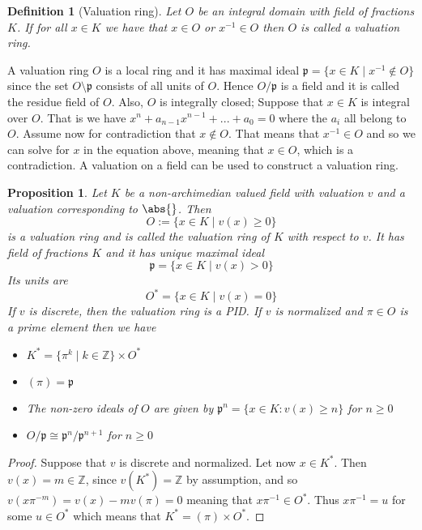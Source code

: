 \documentclass{article}
\newtheorem{definition}{Definition}[section]
\newtheorem{proposition}{Proposition}[section]
\newcommand{\mfrak}[1]{\mathfrak{#1}}
\newcommand{\mbb}[1]{\mathbb{#1}}
\begin{document}
\begin{definition}[Valuation ring]
    Let $O$ be an integral domain with field of fractions $K$. If for all $x \in K$ we have that $x \in O$ or $x^{-1} \in O$ then $O$ is called a valuation ring.
\end{definition}

A valuation ring $O$ is a local ring and it has maximal ideal $\mfrak p = \{x \in K \mid x^{-1} \notin O \}$ since the set $O \setminus \mfrak p$ consists of all units of $O$. Hence $O / \mfrak p$ is a field and it is called the residue field of $O$. Also, $O$ is integrally closed; Suppose that $x \in K$ is integral over $O$. That is we have $x^n + a_{n-1}x^{n-1} + ... + a_0 = 0$ where the $a_i$ all belong to $O$. Assume now for contradiction that $x \notin O$. That means that $x^{-1} \in O$ and so we can solve for $x$ in the equation above, meaning that $x \in O$, which is a contradiction. A valuation on a field can be used to construct a valuation ring.
\begin{proposition}\label{prop: Valuation ring of a field}
    Let $K$ be a non-archimedian valued field with valuation $v$ and a valuation corresponding to $\abs{}$. Then
    $$O := \{x \in K \mid  v(x) \geq 0 \}$$
    is a valuation ring and is called the valuation ring of $K$ with respect to $v$. It has field of fractions $K$ and it has unique maximal ideal
    $$\mfrak p = \{x \in K \mid v(x) > 0 \}$$ %
    Its units are
    $$O^* = \{x \in K \mid v(x) = 0\}$$
    If $v$ is discrete, then the valuation ring is a PID. If $v$ is normalized and $\pi \in O$ is a prime element then we have 
    \begin{itemize}
        \item $K^* = \{\pi^k \mid k \in \mbb Z \} \times O^*$
        \item $(\pi) = \mfrak{p}$
        \item The non-zero ideals of $O$ are given by
        $\mfrak p^n = \{x \in K : v(x) \geq n \}$
        for $n \geq 0$
        \item $O / \mfrak p \cong \mfrak p^n / \mfrak p^{n+1}$ for $n \geq 0$
    \end{itemize}
\end{proposition}
\begin{proof}
    Suppose that $v$ is discrete and normalized. Let now $x \in K^*$. Then $v(x) = m \in \mbb Z$, since $v(K^*) = \mbb Z$ by assumption, and so $v(x \pi^{-m}) = v(x) - mv(\pi) = 0$ meaning that $x \pi^{-1} \in O^*$. Thus $x \pi^{-1} = u$ for some $u \in O^*$ which means that $K^* = (\pi) \times O^*$. 
    
\end{proof}
\end{document}
